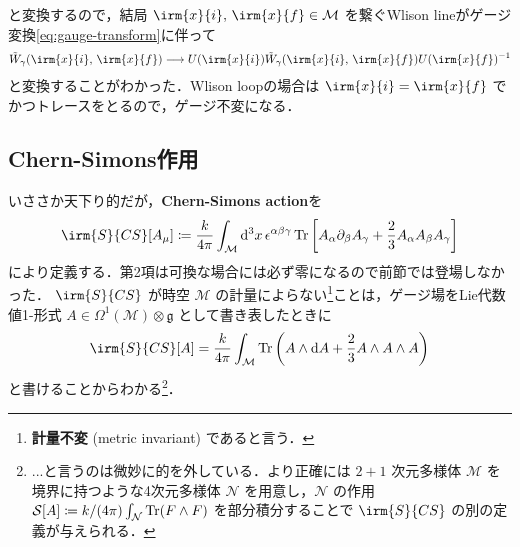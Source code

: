\documentclass[TQFT_main]{subfiles}
\begin{document}
と変換するので，結局 $\irm{x}{i},\, \irm{x}{f} \in \mathcal{M}$ を繋ぐWlison lineがゲージ変換\eqref{eq:gauge-transform}に伴って
\begin{align}
    \tilde{W}_\gamma (\irm{x}{i},\, \irm{x}{f}) \lto U(\irm{x}{i}) \tilde{W}_\gamma (\irm{x}{i},\, \irm{x}{f}) U(\irm{x}{f})^{-1}
\end{align}
と変換することがわかった．Wlison loopの場合は $\irm{x}{i} = \irm{x}{f}$ でかつトレースをとるので，ゲージ不変になる．

\subsection{Chern-Simons作用}

いささか天下り的だが，\textbf{Chern-Simons action}を
\begin{align}
    \irm{S}{CS}[A_\mu] \coloneqq \frac{k}{4\pi} \int_{\mathcal{M}} \dd[3]{x} \epsilon^{\alpha\beta\gamma} \Tr \left[ A_\alpha \partial_\beta A_\gamma + \frac{2}{3} A_\alpha A_\beta A_\gamma \right] 
\end{align}
により定義する．第2項は可換な場合には必ず零になるので前節では登場しなかった．
$\irm{S}{CS}$ が時空 $\mathcal{M}$ の計量によらない\footnote{\textbf{計量不変} (metric invariant) であると言う．}ことは，ゲージ場をLie代数値1-形式 $A \in \Omega^1(\mathcal{M}) \otimes \mathfrak{g}$ として書き表したときに
\begin{align}
    \irm{S}{CS}[A] = \frac{k}{4\pi} \int_{\mathcal{M}} \Tr \left( A \wedge \dd{A} + \frac{2}{3} A \wedge A \wedge A \right) 
\end{align}
と書けることからわかる\footnote{...と言うのは微妙に的を外している．より正確には $2+1$ 次元多様体 $\mathcal{M}$ を境界に持つような4次元多様体 $\mathcal{N}$ を用意し，$\mathcal{N}$ の作用 $\mathcal{S}[A] \coloneqq k/(4\pi) \int_{\mathcal{N}} \Tr (F \wedge F)$ を部分積分することで $\irm{S}{CS}$ の別の定義が与えられる．}．
\end{document}
